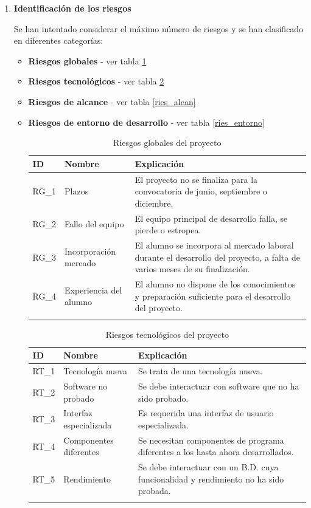 \begin{enumerate}

\item \textbf{Identificación de los riesgos}

Se han intentado considerar el máximo número de riesgos y se han clasificado en diferentes categorías:

\begin{itemize}

\item \textbf{Riesgos globales} - ver tabla \ref{ries_glob}
\item \textbf{Riesgos tecnológicos} - ver tabla \ref{ries_tecno}
\item \textbf{Riesgos de alcance} - ver tabla \ref{ries_alcan}
\item \textbf{Riesgos de entorno de desarrollo} - ver tabla \ref{ries_entorno}

\bigskip
\begingroup
\renewcommand\arraystretch{1.3}

\begin{longtable}{l p{5cm} p{9cm}}
\hline
\textbf{ID} & \textbf{Nombre} & \textbf{Explicación} \\
\hline
\endhead
\endfoot
RG\_1 & 
Plazos &
El proyecto no se finaliza para la convocatoria de junio, septiembre o diciembre.
 \\
RG\_2 & 
Fallo del equipo &
El equipo principal de desarrollo falla, se pierde o estropea. 
 \\
RG\_3 & 
Incorporación mercado &
El alumno se incorpora al mercado laboral durante el desarrollo del proyecto, a falta de varios meses de su finalización.
 \\
RG\_4 & 
Experiencia del alumno &
El alumno no dispone de los conocimientos y preparación suficiente para el desarrollo del proyecto. 
 \\
\hline
\caption{Riesgos globales del proyecto}\label{ries_glob}\\
\end{longtable}

\begin{longtable}{l p{5cm} p{9cm}}
\hline
\textbf{ID} & \textbf{Nombre} & \textbf{Explicación} \\
\hline
\endhead
\endfoot
RT\_1 & 
Tecnología nueva &
Se trata de una tecnología nueva.
 \\
RT\_2 & 
Software no probado &
Se debe interactuar con software que no ha sido probado. 
 \\
RT\_3 & 
Interfaz especializada &
Es requerida una interfaz de usuario especializada.
 \\
RT\_4 & 
Componentes diferentes &
Se necesitan componentes de programa diferentes a los hasta ahora desarrollados.
 \\
RT\_5 & 
Rendimiento &
Se debe interactuar con un B.D. cuya funcionalidad y rendimiento no ha sido probada.
 \\
\hline
\caption{Riesgos tecnológicos del proyecto}\label{ries_tecno}\\
\end{longtable}


\end{itemize}
\end{enumerate}
